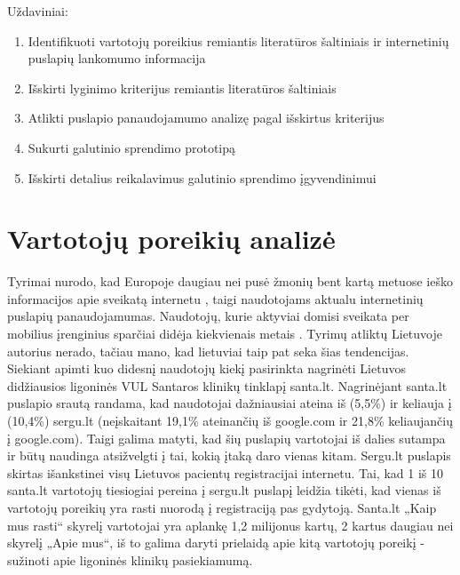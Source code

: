 \documentclass{VUMIFPSkursinis}
\begin{document}
Uždaviniai:
\begin{enumerate}
	\item Identifikuoti vartotojų poreikius remiantis literatūros šaltiniais ir internetinių puslapių lankomumo informacija
	\item Išskirti lyginimo kriterijus remiantis literatūros šaltiniais
	\item Atlikti puslapio panaudojamumo analizę pagal išskirtus kriterijus
	\item Sukurti galutinio sprendimo prototipą
	\item Išskirti detalius reikalavimus galutinio sprendimo įgyvendinimui
\end{enumerate}



\section{Vartotojų poreikių analizė}
Tyrimai nurodo, kad Europoje daugiau nei pusė žmonių bent kartą metuose ieško informacijos apie sveikatą internetu \cite{EuCitizDigHealthEn}, taigi naudotojams aktualu internetinių puslapių panaudojamumas. Naudotojų, kurie aktyviai domisi sveikata per mobilius įrenginius sparčiai didėja kiekvienais metais \cite{EmergingmHealthEn}. Tyrimų atliktų Lietuvoje autorius nerado, tačiau mano, kad lietuviai taip pat seka šias tendencijas. Siekiant apimti kuo didesnį naudotojų kiekį pasirinkta nagrinėti Lietuvos didžiausios ligoninės VUL Santaros klinikų tinklapį santa.lt. Nagrinėjant santa.lt puslapio srautą randama, kad naudotojai dažniausiai ateina iš (5,5\%) ir keliauja į (10,4\%) sergu.lt (neįskaitant 19,1\% ateinančių iš google.com ir 21,8\% keliaujančių į google.com)\cite{AlexaSantaEn}. Taigi galima matyti, kad šių puslapių vartotojai iš dalies sutampa ir būtų naudinga atsižvelgti į tai, kokią įtaką daro vienas kitam. Sergu.lt puslapis skirtas išankstinei visų Lietuvos pacientų registracijai internetu. Tai, kad 1 iš 10 santa.lt vartotojų tiesiogiai pereina į sergu.lt puslapį leidžia tikėti, kad vienas iš vartotojų poreikių yra rasti nuorodą į registraciją pas gydytoją. Santa.lt „Kaip mus rasti“ skyrelį vartotojai yra aplankę 1,2 milijonus kartų\cite{VulSkKaipMusRastiLt}, 2 kartus daugiau nei skyrelį „Apie mus“\cite{VulSkApieMusLt}, iš to galima daryti prielaidą apie kitą vartotojų poreikį - sužinoti apie ligoninės klinikų pasiekiamumą.
\end{document}
